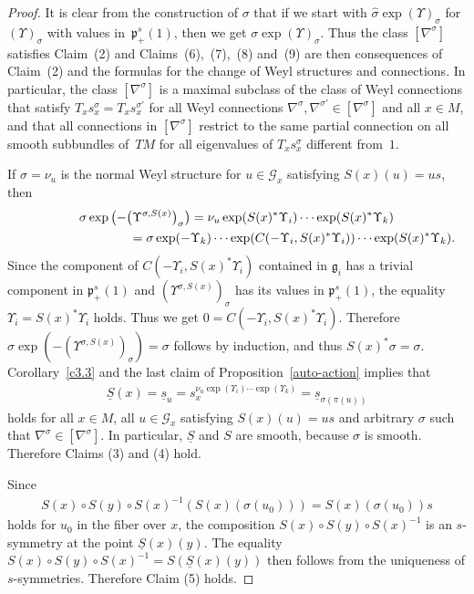 \documentclass[pdftex]{sigma}
\newcommand{\si}{\sigma}
\newcommand{\un}{\underline}
\newcommand{\ba}{\mathcal{G}}
\newcommand{\fg}{\mathfrak g}
\newcommand{\fp}{\mathfrak p}
\newcommand{\U}{\Upsilon}
\numberwithin{equation}{section}
\begin{document}
\begin{proof}
It is clear from the construction of $\si$ that if we start with $\hat \si\exp (\U)_\si$ for $(\U)_\si$ with values in~$\fp^s_+(1)$, then we get $\si\exp(\U)_\si.$ Thus the class $[\nabla^\si]$ satisf\/ies Claim~(2) and Claims~(6),~(7),~(8) and~(9) are then consequences of Claim~(2) and the formulas for the change of Weyl structures and connections. In particular, the class $[\nabla^\si]$ is a maximal subclass of the class of Weyl connections that satisfy $T_xs_x^{\si}=T_xs_x^{\si'}$ for all Weyl connections $\nabla^\si,\nabla^{\si'}\in [\nabla^\si]$ and all $x\in M$, and that all connections in $[\nabla^\si]$ restrict to the same partial connection on all smooth subbundles of~$TM$ for all eigenvalues of $T_xs_x^\si$ dif\/ferent from~$1$.

If $\hat \si=\nu_u$ is the normal Weyl structure for $u\in \ba_x$ satisfying $S(x)(u)=us$, then
\begin{gather*}
\si\exp\big({-}\big(\U^{\si,S(x)}\big)_\si\big)= \nu_u\exp(S(x)^*\U_i)\cdots \exp(S(x)^*\U_k)\\
\hphantom{\si\exp\big({-}\big(\U^{\si,S(x)}\big)_\si\big)}{}
= \si\exp(-\U_k)\cdots \exp(C(-\U_i,S(x)^*\U_i))\cdots \exp(S(x)^*\U_k).
\end{gather*}
Since the component of $C(-\U_i,S(x)^*\U_i)$ contained in $\fg_i$ has a trivial component in $\fp^s_+(1)$ and $(\U^{\si,S(x)})_\si$ has its values in $\fp^s_+(1)$, the equality $\U_i=S(x)^*\U_i$ holds. Thus we get $0=C(-\U_i,S(x)^*\U_i)$. Therefore $\si\exp(-(\U^{\si,S(x)})_\si)=\si$ follows by induction, and thus $S(x)^*\si=\si$. Corollary~\ref{c3.3} and the last claim of Proposition~\ref{auto-action} implies that
\begin{gather*}\un S(x)=\un s_u=s_x^{\nu_u\exp(\U_i)\cdots \exp(\U_k)}=\un s_{\si(\pi(u))}\end{gather*}
holds for all $x\in M$, all $u\in \ba_x$ satisfying $S(x)(u)=us$ and arbitrary $\si$ such that $\nabla^\si\in [\nabla^\si]$. In particular, $\un S$ and $S$ are smooth, because $\si$ is smooth. Therefore Claims (3) and (4) hold.

Since
\begin{gather*}S(x)\circ S(y)\circ S(x)^{-1}(S(x)(\si(u_0)))=S(x)(\si(u_0))s\end{gather*}
holds for $u_0$ in the f\/iber over $x$, the composition $S(x)\circ S(y)\circ S(x)^{-1}$ is an $s$-symmetry at the point $\un S(x)(y)$. The equality $S(x)\circ S(y)\circ S(x)^{-1}=S(\un S(x)(y))$ then follows from the uniqueness of $s$-symmetries. Therefore Claim (5) holds.


\end{proof}
\end{document}
